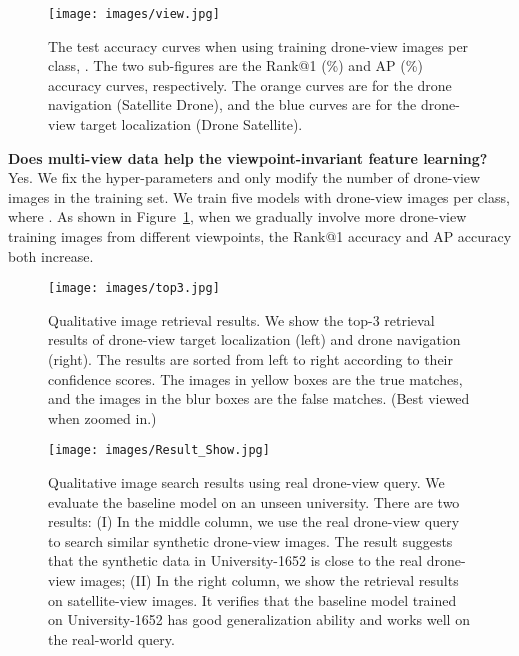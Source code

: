 \documentclass[sigconf]{acmart}
\begin{document}
\begin{figure}[t]
\begin{center}
     \texttt{[image: images/view.jpg]}
\end{center}
\vspace{-.2in}
      \caption{ The test accuracy curves when using  training drone-view images per class, . The two sub-figures are the Rank@1 (\%) and AP (\%) accuracy curves, respectively. The orange curves are for the drone navigation  (Satellite  Drone), and the blue curves are for the drone-view target localization (Drone  Satellite). 
      }\label{fig:views}
\end{figure}

\noindent\textbf{Does multi-view data help the viewpoint-invariant feature learning?} Yes. We fix the hyper-parameters and only modify the number of drone-view images in the training set. We train five models with  drone-view images per class, where . As shown in Figure~\ref{fig:views}, when we gradually involve more drone-view training images from different viewpoints, the Rank@1 accuracy and AP accuracy both increase.  

\begin{figure}[t]
\begin{center}
     \texttt{[image: images/top3.jpg]}
\end{center}
\vspace{-.2in}
      \caption{ Qualitative image retrieval results. We show the top-3 retrieval results of drone-view target localization (left) and drone navigation (right). The results are sorted from left to right according to their confidence scores. The images in yellow boxes are the true matches, and the images in the blur boxes are the false matches. (Best viewed when zoomed in.)
      }\label{fig:visual}
\end{figure}

\begin{figure*}[t]
\begin{center}
     \texttt{[image: images/Result\_Show.jpg]}
\end{center}
\vspace{-.2in}
      \caption{ Qualitative image search results using real drone-view query. We evaluate the baseline model on an unseen university. There are two results: (I) In the middle column, we use the real drone-view query to search similar synthetic drone-view images. The result suggests that the synthetic data in University-1652 is close to the real drone-view images; (II) In the right column, we show the retrieval results on satellite-view images. It verifies that the baseline model trained on University-1652 has good generalization ability and works well on the real-world query.
      }\label{fig:real}
\end{figure*}
\end{document}
